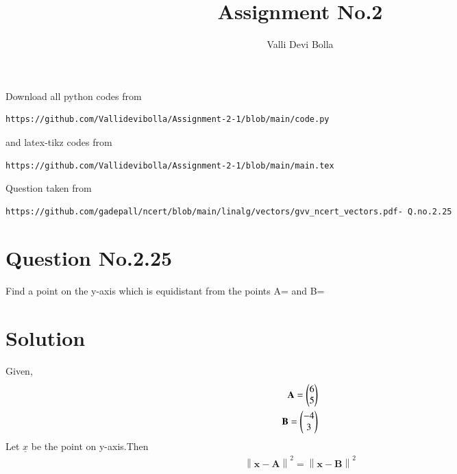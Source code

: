 \documentclass[journal,12pt,twocolumn]{IEEEtran}
\newcommand{\norm}[1]{\left\lVert#1\right\rVert}
\begin{document}
\makeatother
\let\StandardTheFigure\thefigure
\let\vec\mathbf
\renewcommand{\thefigure}{\theproblem}
\def\putbox#1#2#3{\makebox[0in][l]{\makebox[#1][l]{}\raisebox{\baselineskip}[0in][0in]{\raisebox{#2}[0in][0in]{#3}}}}
     \def\rightbox#1{\makebox[0in][r]{#1}}
     \def\centbox#1{\makebox[0in]{#1}}
     \def\topbox#1{\raisebox{-\baselineskip}[0in][0in]{#1}}
     \def\midbox#1{\raisebox{-0.5\baselineskip}[0in][0in]{#1}}
\vspace{3cm}
\title{Assignment No.2}
\author{Valli Devi Bolla}
\maketitle
\newpage
\bigskip
\renewcommand{\thefigure}{\theenumi}
\renewcommand{\thetable}{\theenumi}
Download all python codes from 
\begin{lstlisting}
https://github.com/Vallidevibolla/Assignment-2-1/blob/main/code.py
\end{lstlisting}
%
and latex-tikz codes from 
%
\begin{lstlisting}
https://github.com/Vallidevibolla/Assignment-2-1/blob/main/main.tex
\end{lstlisting}
%
Question taken from
\begin{lstlisting}
https://github.com/gadepall/ncert/blob/main/linalg/vectors/gvv_ncert_vectors.pdf- Q.no.2.25 
\end{lstlisting}
%
\section{Question No.2.25}
Find a point on the y-axis which is equidistant from the points A= and B=
\section{Solution}
Given, 
\begin{align}
\vec{A}=\myvec{6\\5} \\
\vec{B}=\myvec{-4\\3}
\end{align}
Let $\underline{x}$ be the point on y-axis.Then\\
\begin{align}
\boxed{\norm{\vec{x}-\vec{A}}^2 =\norm{\vec{x}-\vec{B}}^2 }
\end{align}
\end{document}
